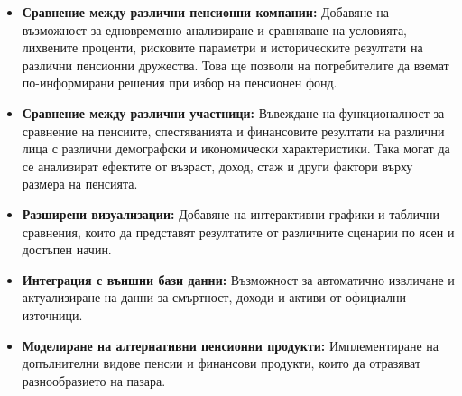 \documentclass[a4paper,12pt]{article}
\begin{document}
\begin{itemize}
        \item \textbf{Сравнение между различни пенсионни компании:} Добавяне на възможност за едновременно анализиране и сравняване на условията, лихвените проценти, рисковите параметри и историческите резултати на различни пенсионни дружества. Това ще позволи на потребителите да вземат по-информирани решения при избор на пенсионен фонд.
        \item \textbf{Сравнение между различни участници:} Въвеждане на функционалност за сравнение на пенсиите, спестяванията и финансовите резултати на различни лица с различни демографски и икономически характеристики. Така могат да се анализират ефектите от възраст, доход, стаж и други фактори върху размера на пенсията.
        \item \textbf{Разширени визуализации:} Добавяне на интерактивни графики и таблични сравнения, които да представят резултатите от различните сценарии по ясен и достъпен начин.
        \item \textbf{Интеграция с външни бази данни:} Възможност за автоматично извличане и актуализиране на данни за смъртност, доходи и активи от официални източници.
        \item \textbf{Моделиране на алтернативни пенсионни продукти:} Имплементиране на допълнителни видове пенсии и финансови продукти, които да отразяват разнообразието на пазара.
\end{itemize}
\end{document}
